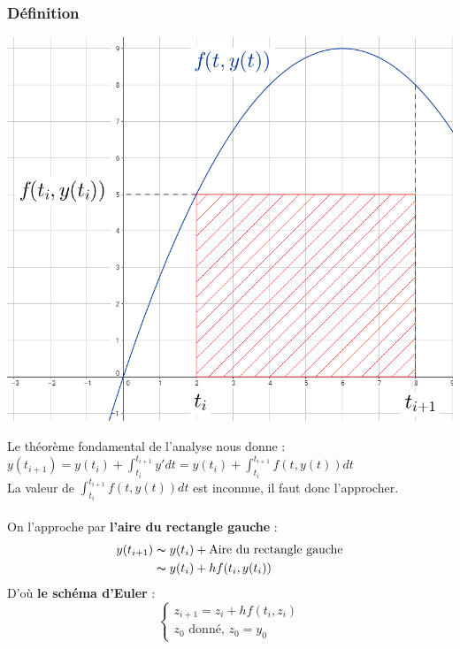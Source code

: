 \documentclass[a4paper,10pt]{report}
\begin{document}
\subsubsection{Définition}
\begin{minipage}{.41\linewidth}
\includegraphics[width=\textwidth]{rectangle.png}
\end{minipage} \hfill
\begin{minipage}{.05\linewidth}
\end{minipage} \hfill
\begin{minipage}{.53\linewidth}
\noindent Le théorème fondamental de l'analyse nous donne : $y(t_{i+1}) = y(t_i) + \int_{t_i}^{t_{i+1}} y'dt = y(t_i) + \int_{t_i}^{t_{i+1}} f(t,y(t))dt$\\
La valeur de $\int_{t_i}^{t_{i+1}} f(t,y(t))dt$ est inconnue, il faut donc l'approcher.\\ \\
On l'approche par \textbf{l'aire du rectangle gauche} :
\abovedisplayskip=0mm
\begin{align*}
   y(t_{i+1}) & \thicksim y(t_i)+ \text{Aire du rectangle gauche} \\
			  & \thicksim y(t_i)+ hf(t_i,y(t_i))
\end{align*}
D'où \textbf{le schéma d'Euler} :
\begin{equation}
\left\lbrace
\begin{array}{l}
z_{i+1}=z_i+hf(t_i,z_i) \\
z_0 \text{ donné, } z_0=y_0
\end{array}\right.
\end{equation}
\end{minipage}
\end{document}
